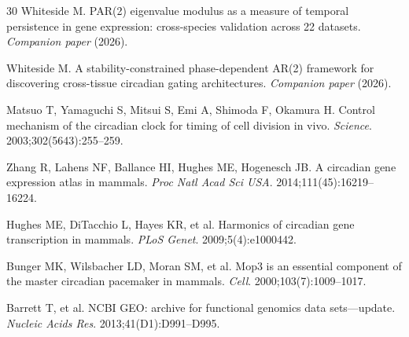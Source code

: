 \documentclass[11pt,letterpaper]{article}
\theoremstyle{definition}
\theoremstyle{remark}
\begin{document}
\begin{thebibliography}{30}
Whiteside M.
PAR(2) eigenvalue modulus as a measure of temporal persistence in gene expression: cross-species validation across 22 datasets.
\textit{Companion paper} (2026).

Whiteside M.
A stability-constrained phase-dependent AR(2) framework for discovering cross-tissue circadian gating architectures.
\textit{Companion paper} (2026).

Matsuo T, Yamaguchi S, Mitsui S, Emi A, Shimoda F, Okamura H.
Control mechanism of the circadian clock for timing of cell division in vivo.
\textit{Science}. 2003;302(5643):255--259.

Zhang R, Lahens NF, Ballance HI, Hughes ME, Hogenesch JB.
A circadian gene expression atlas in mammals.
\textit{Proc Natl Acad Sci USA}. 2014;111(45):16219--16224.

Hughes ME, DiTacchio L, Hayes KR, et al.
Harmonics of circadian gene transcription in mammals.
\textit{PLoS Genet}. 2009;5(4):e1000442.

Bunger MK, Wilsbacher LD, Moran SM, et al.
Mop3 is an essential component of the master circadian pacemaker in mammals.
\textit{Cell}. 2000;103(7):1009--1017.

Barrett T, et al.
NCBI GEO: archive for functional genomics data sets---update.
\textit{Nucleic Acids Res}. 2013;41(D1):D991--D995.

\end{thebibliography}
\end{document}
